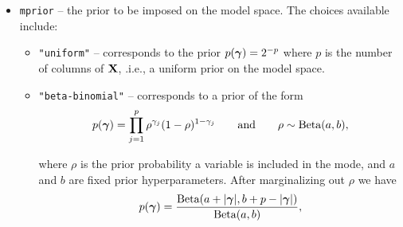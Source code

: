 {\begin{itemize}
\begin{itemize}
        \item {\tt "liang\_g\_n\_appell"} -- the mixture $g/n$-prior of
            \cite{Liang2008} with prior hyperparameter $a=3$ evaluated using
            the {\tt appell R} package.
		
        \item {\tt "liang\_g\_approx"} -- the mixture $g/n$-prior of
            \cite{Liang2008} with prior hyperparameter $a=3$ using the
            approximation (\ref{eq:hyperGonNmarginalApprox}) for $p_\vgamma >2$
            and numerical quadrature (see below) ofr $p_\vgamma\in \{1,2\}$.
		
        \item {\tt "liang\_g\_n\_quad"} -- the mixture $g/n$-prior of
            \cite{Liang2008} with prior hyperparameter $a=3$ evaluated using a
            composite trapezoid rule.
		
        \item {\tt "robust\_bayarri1"} -- the robust prior of
            \cite{Bayarri2012} using default prior hyperparameter choices
            evaluated directly using (\ref{eq:yGivenGammaRobust}) with the {\tt
            gsl} library.
		
        \item {\tt "robust\_bayarri2"} -- the robust prior of
            \cite{Bayarri2012} using default prior hyperparameter choices
            evaluated directly using (\ref{eq:yGivenGammaRobust2}).
		
	\end{itemize}
    \item {\tt mprior} -- the prior to be imposed on the model space. The
        choices available include:
	\begin{itemize}
        \item {\tt "uniform"} -- corresponds to the prior $p({\boldsymbol \gamma}) = 2^{-p}$
            where $p$ is the number of columns of ${\bf X}$, .i.e., a uniform prior
            on the model space.
		
        \item {\tt "beta-binomial"} -- corresponds to a prior of the form
		$$
		\displaystyle p({\boldsymbol \gamma}) = \prod_{j=1}^p \rho^{\gamma_j} (1 - \rho)^{1 - \gamma_j} \qquad \mbox{and} \qquad \rho \sim \mbox{Beta}(a,b),
		$$
		
        \noindent where $\rho$ is the prior probability a variable is included
        in the mode, and $a$ and $b$ are fixed prior hyperparameters. After
        marginalizing out $\rho$ we have
		$$
		p({\boldsymbol \gamma}) = \frac{\mbox{Beta}(a + |{\boldsymbol \gamma}|,b + p - |{\boldsymbol \gamma}|)}{\mbox{Beta}(a,b)},
		$$
		

\end{itemize}
\end{itemize}}
